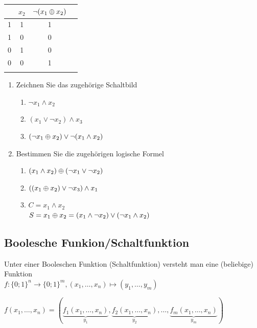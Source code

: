 \begin{longtable}{c|c|c|c}
\begin{tabular}{c|c|c}
		$x_1$ & $x_2$ & $\neg(x_1\oplus x_2)$ \\ 
		\hline 
		1 & 1 & 1 \\ 
		1 & 0 & 0 \\ 
		0 & 1 & 0 \\ 
		0 & 0 & 1 \\ 
	\end{tabular}  \\ 
	\hline 
\end{longtable} 

\clearpage
\Bsps
\begin{enumerate}
	\item Zeichnen Sie das zugehörige Schaltbild
	\begin{enumerate}
		\item $\neg x_1\land x_2$
		
		\item $(x_1\lor\neg x_2)\land x_3$
		
		\item $(\neg x_1\oplus x_2)\lor\neg(x_1\land x_2)$
	\end{enumerate}
	
	\item Bestimmen Sie die zugehörigen logische Formel
	\begin{enumerate}
		\item $(x_1\land x_2)\oplus(\neg x_1\lor\neg x_2)$
		
		\item $((x_1\oplus x_2)\lor \neg x_3)\land x_1$
		
		\item $C=x_1\land x_2$\\
		$S=x_1\oplus x_2 = (x_1\land\neg x_2)\lor(\neg x_1 \land x_2)$
	\end{enumerate}
\end{enumerate}

\clearpage
\subsection{Boolesche Funkion/Schaltfunktion}
\Def Unter einer Booleschen Funktion (Schaltfunktion) versteht man eine (beliebige) Funktion\\
$f:\{0;1\}^n\to\{0;1\}^m, (x_1,\ldots,x_n)\mapsto(y_1,\ldots,y_m)$

$f(x_1,\ldots,x_n)=(\underbrace{f_1(x_1,\ldots,x_n)}_{y_1},\underbrace{f_2(x_1,\ldots,x_n)}_{y_2},\ldots,\underbrace{f_m(x_1,\ldots,x_n)}_{y_m})$

